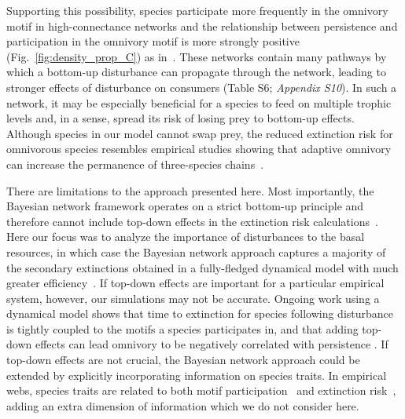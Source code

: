 \documentclass[12pt]{article}
\begin{document}
\begin{spacing}{2.0}
    Supporting this possibility, species participate more frequently in the omnivory motif in high-connectance networks and the relationship between persistence and participation in the omnivory motif is more strongly positive (Fig.~\ref{fig:density_prop_C}) as in~\citep{McLeod2021}.
    These networks contain many pathways by which a bottom-up disturbance can propagate through the network, leading to stronger effects of disturbance on consumers (Table S6; \emph{Appendix S10}).
    In such a network, it may be especially beneficial for a species to feed on multiple trophic levels and, in a sense, spread its risk of losing prey to bottom-up effects.
    Although species in our model cannot swap prey, the reduced extinction risk for omnivorous species resembles empirical studies showing that adaptive omnivory can increase the permanence of three-species chains~\citep{Fagan1997, Kvrivan2005, AbramsFung2010}.
    
    
    There are limitations to the approach presented here.
    Most importantly, the Bayesian network framework operates on a  strict bottom-up principle and therefore cannot include top-down effects in the extinction risk calculations~\citep{Eklof2013}. 
    Here our focus was to analyze the importance of disturbances to the basal resources, in which case the Bayesian network approach captures a majority of the secondary extinctions obtained in a fully-fledged dynamical model with much greater efficiency~\citep{Eklof2013}.
    If top-down effects are important for a particular empirical system, however, our simulations may not be accurate. 
    Ongoing work using a dynamical model shows that time to extinction for species following disturbance is tightly coupled to the motifs a species participates in, and that adding top-down effects can lead omnivory to be negatively correlated with persistence \citep{Cirtwill2021_inprep}. 
    If top-down effects are not crucial, the Bayesian network approach could be extended by explicitly incorporating information on species traits.
    In empirical webs, species traits are related to both motif participation~\citep{cirtwill2018feeding} and extinction risk~\citep{Brose2017, curtsdotter2011robustness, Cardillo2005, Purvis2000},
    adding an extra dimension of information which we do not consider here.
    

\end{spacing}
\end{document}
